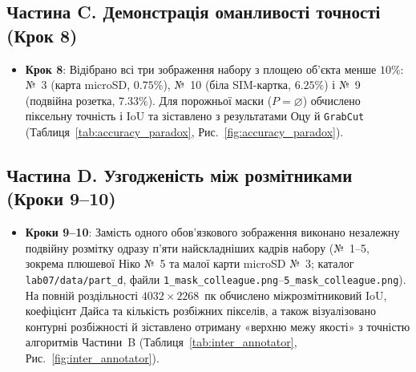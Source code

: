 \documentclass[14pt, a4paper]{extarticle}
\begin{document}
\subsection{Частина C. Демонстрація оманливості точності (Крок 8)}
\begin{itemize}
    \item \textbf{Крок 8}: Відібрано всі три зображення набору з площею об'єкта менше $10\%$: №~3 (карта microSD, $0.75\%$), №~10 (біла SIM-картка, $6.25\%$) і №~9 (подвійна розетка, $7.33\%$). Для порожньої маски ($P = \varnothing$) обчислено піксельну точність і $\text{IoU}$ та зіставлено з результатами Оцу й \texttt{GrabCut} (Таблиця~\ref{tab:accuracy_paradox}, Рис.~\ref{fig:accuracy_paradox}).
\end{itemize}

\subsection{Частина D. Узгодженість між розмітниками (Кроки 9--10)}
\begin{itemize}
    \item \textbf{Кроки 9--10}: Замість одного обов'язкового зображення виконано незалежну подвійну розмітку одразу п'яти найскладніших кадрів набору (№~1--5, зокрема плюшевої Ніко №~5 та малої карти microSD №~3; каталог \texttt{lab07/data/part\_d}, файли \texttt{1\_mask\_colleague.png}--\texttt{5\_mask\_colleague.png}). На повній роздільності $4032 \times 2268$~пк обчислено міжрозмітниковий $\text{IoU}$, коефіцієнт Дайса та кількість розбіжних пікселів, а також візуалізовано контурні розбіжності й зіставлено отриману «верхню межу якості» з точністю алгоритмів Частини~B (Таблиця~\ref{tab:inter_annotator}, Рис.~\ref{fig:inter_annotator}).
\end{itemize}
\end{document}
